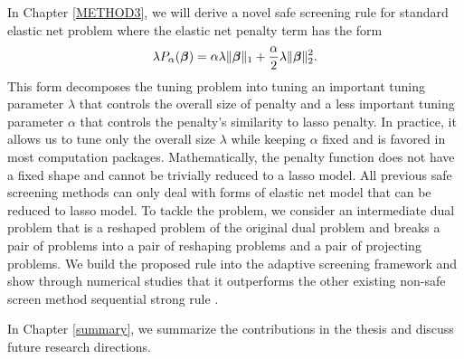 In Chapter \ref{METHOD3}, we will derive a novel safe screening rule for standard elastic net problem where the elastic net penalty term has the form
\begin{equation}
    \lambda P_\alpha(\boldsymbol\beta)=\alpha \lambda \lVert\boldsymbol\beta\rVert_1+\frac{\alpha}{2}\lambda\lVert\boldsymbol\beta\rVert_2^2.
\end{equation}
This form decomposes the tuning problem into tuning an important tuning parameter $\lambda$ that controls the overall size of penalty and a less important tuning parameter $\alpha$ that controls the penalty's similarity to lasso penalty. In practice, it allows us to tune only the overall size $\lambda$ while keeping $\alpha$ fixed and is favored in most computation packages. Mathematically, the penalty function does not have a fixed shape and cannot be trivially reduced to a lasso model. All previous safe screening methods can only deal with forms of elastic net model that can be reduced to lasso model. To tackle the problem, we consider an intermediate dual problem that is a reshaped problem of the original dual problem and breaks a pair of problems into a pair of reshaping problems and a pair of projecting problems. We build the proposed rule into the adaptive screening framework and show through numerical studies that it outperforms the other existing non-safe screen method sequential strong rule \citep{Tibshirani2012}.

In Chapter \ref{summary}, we summarize the contributions in the thesis and discuss future research directions.